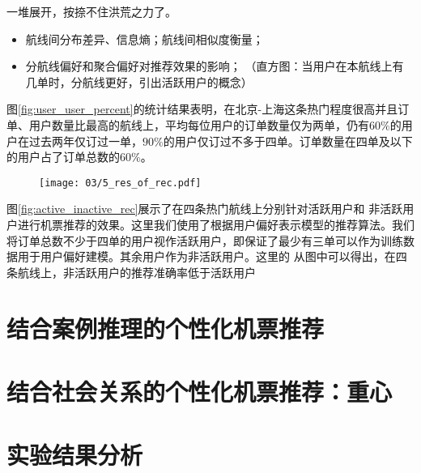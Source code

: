 一堆展开，按捺不住洪荒之力了。

\begin{itemize}
	\item 航线间分布差异、信息熵；航线间相似度衡量；
	\item 分航线偏好和聚合偏好对推荐效果的影响；
	（直方图：当用户在本航线上有几单时，分航线更好，引出活跃用户的概念）
\end{itemize}




图\ref{fig:user_user_percent}的统计结果表明，在北京-上海这条热门程度很高并且订单、用户数量比最高的航线上，平均每位用户的订单数量仅为两单，仍有$60\%$的用户在过去两年仅订过一单，$90\%$的用户仅订过不多于四单。订单数量在四单及以下的用户占了订单总数的$60\%$。

\begin{figure}
 \centering
 \texttt{[image: 03/5\_res\_of\_rec.pdf]}
\end{figure}\par

图\ref{fig:active_inactive_rec}展示了在四条热门航线上分别针对活跃用户和
非活跃用户进行机票推荐的效果。这里我们使用了根据用户偏好表示模型的推荐算法。我们将订单总数不少于四单的用户视作活跃用户，即保证了最少有三单可以作为训练数据用于用户偏好建模。其余用户作为非活跃用户。这里的
从图中可以得出，在四条航线上，非活跃用户的推荐准确率低于活跃用户



\section{结合案例推理的个性化机票推荐}


\section{结合社会关系的个性化机票推荐：重心}


\section{实验结果分析}